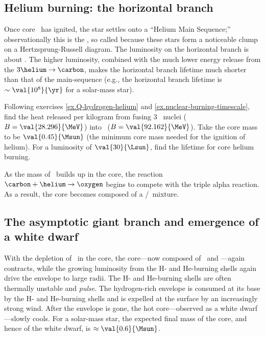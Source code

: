 \subsection{Helium burning: the horizontal branch}

Once core \helium\ has ignited, the star settles onto a ``Helium Main Sequence;'' observationally this is the , so called because these stars form a noticeable clump on a Hertzsprung-Russell diagram. The luminosity on the horizontal branch is about . The higher luminosity, combined with the much lower energy release from the $3\helium\to\carbon$, makes the horizontal branch lifetime much shorter than that of the main-sequence (e.g., the horizontal branch lifetime is $\sim \val{10^{8}}{\yr}$ for a solar-mass star).

\begin{exercisebox}
Following exercises \ref{ex.Q-hydrogen-helium} and \ref{ex.nuclear-burning-timescale}, find the heat released per kilogram from fusing 3 \helium\ nuclei ($B=\val{28.296}{\MeV}$) into \carbon\ ($B=\val{92.162}{\MeV}$). Take the core mass to be $\val{0.45}{\Msun}$ (the minimum core mass needed for the ignition of helium). For a luminosity of $\val{30}{\Lsun}$, find the lifetime for core helium burning.
\end{exercisebox}

As the mass of \carbon\ builds up in the core, the reaction $\carbon+\helium\to\oxygen$ begins to compete with the triple alpha reaction. As a result, the core becomes composed of a \carbon/\oxygen\ mixture.

\subsection{The asymptotic giant branch and emergence of a white dwarf}

With the depletion of \helium\ in the core, the core---now composed of \carbon\ and \oxygen---again contracts, while the growing luminosity from the H- and He-burning shells again drive the envelope to large radii.  The H- and He-burning shells are often thermally unstable and \emph{pulse}.  The hydrogen-rich envelope is consumed at its base by the H- and He-burning shells and is expelled at the surface by an increasingly strong wind. After the envelope is gone, the hot core---observed as a white dwarf---slowly cools. For a solar-mass star, the expected final mass of the core, and hence of the white dwarf, is $\approx\val{0.6}{\Msun}$.

